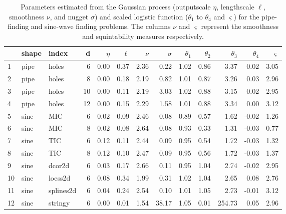 \documentclass[
  12pt,
]{interact}
\theoremstyle{plain}
\begin{document}
\hypertarget{tbl-smoothness-squintability}{}
\begin{table}
\caption{\label{tbl-smoothness-squintability}Parameters estimated from the Gaussian process (outputscale \(\eta\),
lengthscale \(\ell\), smoothness \(\nu\), and nugget \(\sigma\)) and
scaled logistic function (\(\theta_1\) to \(\theta_4\) and
\(\varsigma\)) for the pipe-finding and sine-wave finding problems. The
columns \(\nu\) and \(\varsigma\) represent the smoothness and
squintability measures respectively. }\tabularnewline

\centering\begingroup\fontsize{10}{12}\selectfont

\begin{tabular}{|>{}lll>{}r|rrr>{}r|rrrr>{}r|}
\toprule
  & shape & index & d & $\eta$ & $\ell$ & $\nu$ & $\sigma$ & $\theta_1$ & $\theta_2$ & $\theta_3$ & $\theta_4$ & $\varsigma$\\
\midrule
1 & pipe & holes & 6 & 0.00 & 0.37 & 2.36 & 0.22 & 1.02 & 0.86 & 3.37 & 0.02 & 3.05\\
2 & pipe & holes & 8 & 0.00 & 0.18 & 2.19 & 0.82 & 1.01 & 0.87 & 3.26 & 0.03 & 2.96\\
3 & pipe & holes & 10 & 0.00 & 0.11 & 2.19 & 3.03 & 1.02 & 0.88 & 3.15 & 0.02 & 2.95\\
4 & pipe & holes & 12 & 0.00 & 0.15 & 2.29 & 1.58 & 1.01 & 0.88 & 3.34 & 0.00 & 3.12\\
5 & sine & MIC & 6 & 0.02 & 0.09 & 2.46 & 0.08 & 0.89 & 0.57 & 1.62 & -0.02 & 1.26\\
6 & sine & MIC & 8 & 0.02 & 0.08 & 2.64 & 0.08 & 0.93 & 0.33 & 1.31 & -0.03 & 0.77\\
7 & sine & TIC & 6 & 0.12 & 0.11 & 2.44 & 0.09 & 0.95 & 0.54 & 1.72 & -0.03 & 1.32\\
8 & sine & TIC & 8 & 0.12 & 0.10 & 2.47 & 0.09 & 0.95 & 0.56 & 1.72 & -0.03 & 1.37\\
9 & sine & dcor2d & 6 & 0.03 & 0.17 & 2.66 & 0.11 & 0.95 & 1.04 & 2.74 & -0.02 & 2.95\\
10 & sine & loess2d & 6 & 0.08 & 0.34 & 1.99 & 0.31 & 1.02 & 1.04 & 2.65 & 0.08 & 2.76\\
11 & sine & splines2d & 6 & 0.04 & 0.24 & 2.54 & 0.10 & 1.01 & 1.05 & 2.73 & -0.01 & 3.12\\
12 & sine & stringy & 6 & 0.00 & 0.01 & 1.54 & 38.17 & 1.05 & 0.01 & 254.73 & 0.05 & 2.96\\
\bottomrule
\end{tabular}
\endgroup{}
\end{table}
\end{document}
